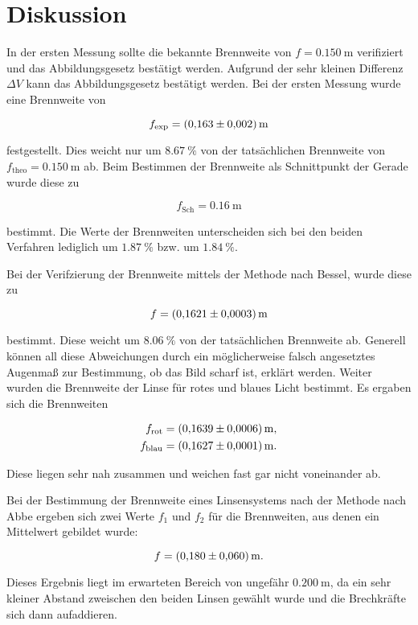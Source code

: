 \section{Diskussion}
\label{sec:Diskussion}

In der ersten Messung sollte die bekannte Brennweite von $f = \SI{0.150}{\meter}$ verifiziert und das 
Abbildungsgesetz bestätigt werden. Aufgrund der sehr kleinen Differenz $\Delta V$ kann das Abbildungsgesetz
bestätigt werden. Bei der ersten Messung wurde eine Brennweite von 

\begin{equation*}
f_\text{exp} = \SI{0.163+-0.002}{\meter}
\end{equation*}

festgestellt. Dies weicht nur um $\SI{8.67}{\percent}$ von der tatsächlichen Brennweite von 
$f_\text{theo}=\SI{0.150}{\meter}$ ab. Beim Bestimmen der Brennweite als Schnittpunkt der 
Gerade wurde diese zu 

\begin{equation*}
f_\text{Sch} = \SI{0.16}{\meter} 
\end{equation*}

bestimmt. Die Werte der Brennweiten unterscheiden sich bei den beiden Verfahren lediglich um 
$\SI{1.87}{\percent}$ bzw. um $\SI{1.84}{\percent}$. 

Bei der Verifzierung der Brennweite mittels der Methode nach Bessel, wurde diese zu 

\begin{equation*}
f = \SI{0.1621+-0.0003}{\meter}
\end{equation*}

bestimmt. Diese weicht um $\SI{8.06}{\percent}$ von der tatsächlichen Brennweite ab. Generell 
können all diese Abweichungen durch ein möglicherweise falsch angesetztes Augenmaß zur Bestimmung, ob das 
Bild scharf ist, erklärt werden. Weiter wurden die Brennweite der Linse für rotes und blaues Licht 
bestimmt. Es ergaben sich die Brennweiten

\begin{align*}
f_\text{rot} &= \SI{0.1639+-0.0006}{\meter},\\
f_\text{blau} & = \SI{0.1627+-0.0001}{\meter}.
\end{align*}

Diese liegen sehr nah zusammen und weichen fast gar nicht voneinander ab. 

Bei der Bestimmung der Brennweite eines Linsensystems nach der Methode nach Abbe ergeben sich 
zwei Werte $f_1$ und $f_2$ für die Brennweiten, aus denen ein Mittelwert gebildet wurde:

\begin{equation*}
f = \SI{0.180+-0.060}{\meter}.
\end{equation*}

Dieses Ergebnis liegt im erwarteten Bereich von ungefähr $\SI{0.200}{\meter}$, da ein 
sehr kleiner Abstand zweischen den beiden Linsen gewählt wurde und die Brechkräfte sich dann
aufaddieren. 